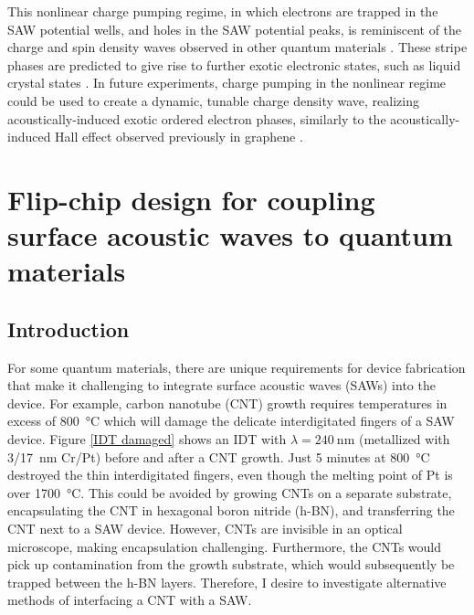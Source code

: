 \documentclass[double,12pt,1in,seploa]{beavtex}
\let\Oldsection\section
\renewcommand{\section}{\FloatBarrier\Oldsection}
\begin{document}
This nonlinear charge pumping regime, in which electrons are trapped in the SAW potential wells, and holes in the SAW potential peaks, is reminiscent of the charge and spin density waves observed in other quantum materials \cite{rahnejat_charge_2011,pasztor_multiband_2021}. These stripe phases are predicted to give rise to further exotic electronic states, such as liquid crystal states \cite{fradkin_liquid-crystal_1999}. In future experiments, charge pumping in the nonlinear regime could be used to create a dynamic, tunable charge density wave, realizing acoustically-induced exotic ordered electron phases, similarly to the acoustically-induced Hall effect observed previously in graphene \cite{zhao_acoustically_2022}. 


\chapter{Flip-chip design for coupling surface acoustic waves to quantum materials} \label{flip-chip chapter}

\section{Introduction}

For some quantum materials, there are unique requirements for device fabrication that make it challenging to integrate surface acoustic waves (SAWs) into the device. For example, carbon nanotube (CNT) growth requires temperatures in excess of \SI{800}{\celsius} which will damage the delicate interdigitated fingers of a SAW device. Figure \ref{IDT damaged} shows an IDT with $\lambda = \SI{240}{\nano\meter}$ (metallized with 3/\SI{17}{\nano\meter} Cr/Pt) before and after a CNT growth. Just 5 minutes at \SI{800}{\celsius} destroyed the thin interdigitated fingers, even though the melting point of Pt is over \SI{1700}{\celsius}. This could be avoided by growing CNTs on a separate substrate, encapsulating the CNT in hexagonal boron nitride (h-BN), and transferring the CNT next to a SAW device. However, CNTs are invisible in an optical microscope, making encapsulation challenging. Furthermore, the CNTs would pick up contamination from the growth substrate, which would subsequently be trapped between the h-BN layers. Therefore, I desire to investigate alternative methods of interfacing a CNT with a SAW.
\end{document}
